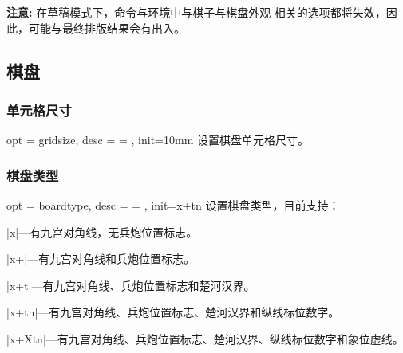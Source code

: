 \documentclass[full]{l3doc}
\begin{document}
\begin{documentation}
  \textbf{\textsf{注意: }}在草稿模式下，命令与环境中与棋子与棋盘外观
  相关的选项都将失效，因此，可能与最终排版结果会有出入。

\begin{SideBySideExample}[frame=single,numbers=left,
                xrightmargin=.53\linewidth,gobble=2]
  \centering
  \cchessboard[draft]
\end{SideBySideExample}
\subsection{棋盘}

\subsubsection{单元格尺寸}

\begin{option}{ opt = gridsize, desc = {= }, init=10mm }
  设置棋盘单元格尺寸。
\end{option}

\begin{SideBySideExample}[frame=single,numbers=left,
                xrightmargin=.60\linewidth,gobble=2]
  \centering
  \cchessboard[gridsize=15mm]
\end{SideBySideExample}

\bigskip

\subsubsection{棋盘类型}

\begin{option}{ opt = boardtype, desc = {= }, init=x+tn }
  设置棋盘类型，目前支持：
\end{option}

  \begin{Description}[a]
    \item |x|---有九宫对角线，无兵炮位置标志。
    \item |x+|---有九宫对角线和兵炮位置标志。
    \item |x+t|---有九宫对角线、兵炮位置标志和楚河汉界。
    \item |x+tn|---有九宫对角线、兵炮位置标志、楚河汉界和纵线标位数字。
    \item |x+Xtn|---有九宫对角线、兵炮位置标志、楚河汉界、纵线标位数字和象位虚线。
  \end{Description}


\end{documentation}
\end{document}
